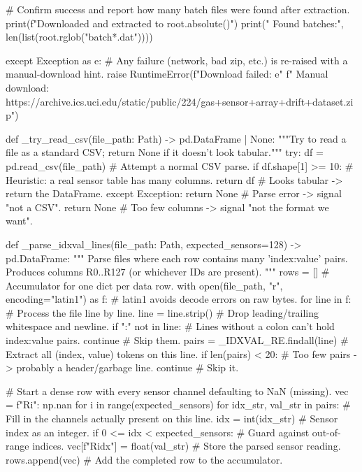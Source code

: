         # Confirm success and report how many batch files were found after extraction.
        print(f"Downloaded and extracted to {root.absolute()}")
        print("   Found batches:", len(list(root.rglob("batch*.dat"))))

    except Exception as e:
        # Any failure (network, bad zip, etc.) is re-raised with a manual-download hint.
        raise RuntimeError(f"Download failed: {e}\n"
                          f"   Manual download: https://archive.ics.uci.edu/static/public/224/gas+sensor+array+drift+dataset.zip")

def _try_read_csv(file_path: Path) -> pd.DataFrame | None:
    """Try to read a file as a standard CSV; return None if it doesn't look tabular."""
    try:
        df = pd.read_csv(file_path)        # Attempt a normal CSV parse.
        if df.shape[1] >= 10:              # Heuristic: a real sensor table has many columns.
            return df                      # Looks tabular -> return the DataFrame.
    except Exception:
        return None                        # Parse error -> signal "not a CSV".
    return None                            # Too few columns -> signal "not the format we want".

def _parse_idxval_lines(file_path: Path, expected_sensors=128) -> pd.DataFrame:
    """
    Parse files where each row contains many 'index:value' pairs.
    Produces columns R0..R127 (or whichever IDs are present).
    """
    rows = []                              # Accumulator for one dict per data row.
    with open(file_path, "r", encoding="latin1") as f:  # latin1 avoids decode errors on raw bytes.
        for line in f:                     # Process the file line by line.
            line = line.strip()            # Drop leading/trailing whitespace and newline.
            if ":" not in line:            # Lines without a colon can't hold index:value pairs.
                continue                   # Skip them.
            pairs = _IDXVAL_RE.findall(line)  # Extract all (index, value) tokens on this line.
            if len(pairs) < 20:            # Too few pairs -> probably a header/garbage line.
                continue                   # Skip it.

            # Start a dense row with every sensor channel defaulting to NaN (missing).
            vec = {f"R{i}": np.nan for i in range(expected_sensors)}
            for idx_str, val_str in pairs:  # Fill in the channels actually present on this line.
                idx = int(idx_str)         # Sensor index as an integer.
                if 0 <= idx < expected_sensors:  # Guard against out-of-range indices.
                    vec[f"R{idx}"] = float(val_str)  # Store the parsed sensor reading.
            rows.append(vec)               # Add the completed row to the accumulator.

